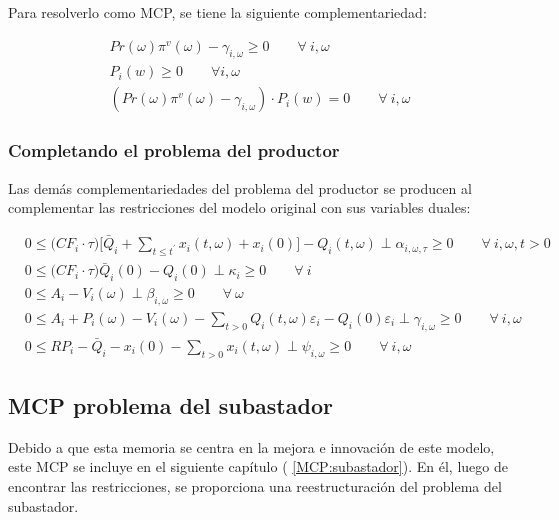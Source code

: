 Para resolverlo como MCP, se tiene la siguiente complementariedad:
\begin{footnotesize}
\begin{align}
    Pr(\omega) \pi^v(\omega) -\gamma_{i,\omega} \geq 0 \qquad \forall \  i, \omega \\
    P_i(w) \geq 0 \qquad \forall  i,\omega \\
    (Pr(\omega) \pi^v(\omega) -\gamma_{i,\omega}) \cdot  P_i(w) = 0  \qquad \forall \  i, \omega 
\end{align}

\end{footnotesize}


\subsubsection{Completando el problema del productor}

Las demás complementariedades del problema del productor se producen al complementar las restricciones del modelo original con sus variables duales:

\begin{footnotesize}
\begin{align}
    & 0 \leq \big(CF_i \cdot \tau \big) \Bigg[\bar{Q}_i + \sum_{t\leq t^{\prime}} x_i(t,\omega) + x_i(0) \Bigg] - Q_i(t,\omega)  \perp \alpha_{i,\omega,\tau} \geq 0 \qquad \forall \ i, \omega, t  > 0\\
    & 0 \leq \Big(CF_i\cdot\tau \Big)\bar{Q}_i(0)-Q_{i}(0) \perp \kappa_i \geq 0 \qquad \forall \ i \\
    & 0 \leq  A_{i} - V_i(\omega) \perp \beta_{i,\omega} \geq 0 \qquad \forall  \ \omega \\
    & 0 \leq  A_{i} + P_{i} (\omega) - V_i(\omega) - \sum_{t>0} Q_i(t,\omega) \varepsilon_{i} -Q_i(0)\varepsilon_{i} \perp \gamma_{i,\omega} \geq 0 \qquad \forall \ i, \omega\\
    & 0 \leq  RP_i - \bar{Q}_i - x_i(0) - \sum_{t>0} x_i(t,\omega) \perp \psi_{i,\omega} \geq 0 \qquad \forall \ i,\omega 
\end{align}

\end{footnotesize}


\subsection{MCP problema del subastador}

Debido a que esta memoria se centra en la mejora e innovación de este modelo, este MCP se incluye en el siguiente capítulo ( \ref{MCP:subastador}). En él, luego de encontrar las restricciones, se proporciona una reestructuración del problema del subastador. 

